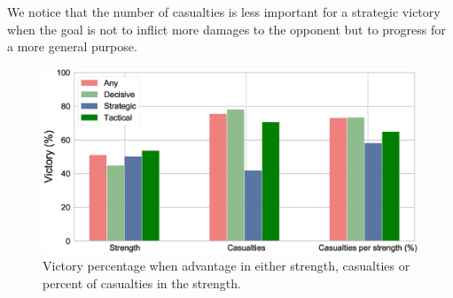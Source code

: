 We notice that the number of casualties is less important for a strategic victory when the goal is not to inflict more damages to the opponent but to progress for a more general purpose.
 \begin{figure}[h]
	\centering	\includegraphics[width=\linewidth]{figures/VictoryAdvantage}
	\caption{Victory percentage when advantage in either strength, casualties or percent of casualties in the strength.}\label{fig:victoryAdvantage}
	\centering
\end{figure}

